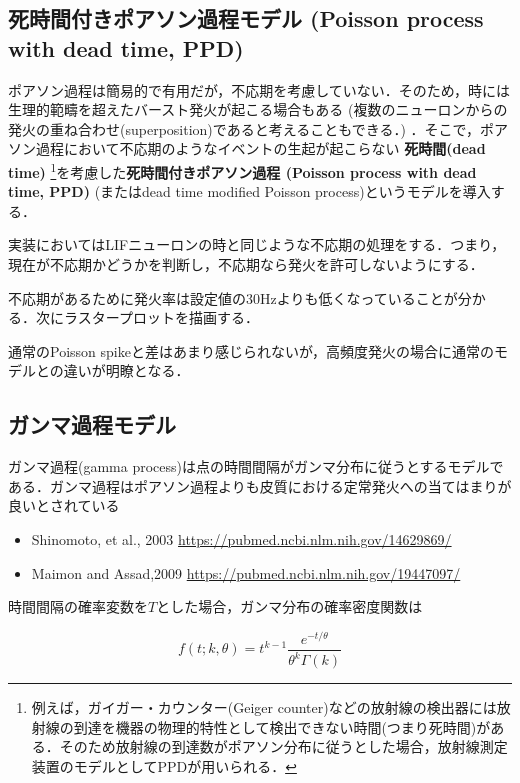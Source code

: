 \subsection{死時間付きポアソン過程モデル (Poisson process with dead time, PPD)}
ポアソン過程は簡易的で有用だが，不応期を考慮していない．そのため，時には生理的範疇を超えたバースト発火が起こる場合もある (複数のニューロンからの発火の重ね合わせ(superposition)であると考えることもできる．) ．そこで，ポアソン過程において不応期のようなイベントの生起が起こらない \textbf{死時間(dead time)} \footnote{例えば，ガイガー・カウンター(Geiger counter)などの放射線の検出器には放射線の到達を機器の物理的特性として検出できない時間(つまり死時間)がある．そのため放射線の到達数がポアソン分布に従うとした場合，放射線測定装置のモデルとしてPPDが用いられる．}を考慮した\textbf{死時間付きポアソン過程 (Poisson process with dead time, PPD)} (またはdead time modified Poisson process)というモデルを導入する．

実装においてはLIFニューロンの時と同じような不応期の処理をする．つまり，現在が不応期かどうかを判断し，不応期なら発火を許可しないようにする．

不応期があるために発火率は設定値の30Hzよりも低くなっていることが分かる．次にラスタープロットを描画する．


通常のPoisson spikeと差はあまり感じられないが，高頻度発火の場合に通常のモデルとの違いが明瞭となる．
\subsection{ガンマ過程モデル}
ガンマ過程(gamma process)は点の時間間隔がガンマ分布に従うとするモデルである．ガンマ過程はポアソン過程よりも皮質における定常発火への当てはまりが良いとされている
\begin{itemize}
\item Shinomoto, et al., 2003 \url{https://pubmed.ncbi.nlm.nih.gov/14629869/}
\item Maimon and Assad,2009 \url{https://pubmed.ncbi.nlm.nih.gov/19447097/}
\end{itemize}

時間間隔の確率変数を$T$とした場合，ガンマ分布の確率密度関数は


\begin{equation}
f(t;k,\theta) =  t^{k-1}\frac{e^{-t/\theta}}{\theta^k\Gamma(k)}
\end{equation}


